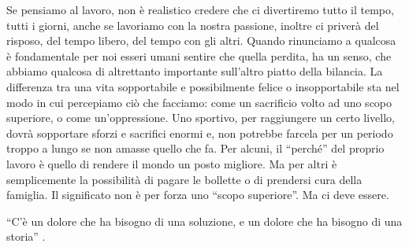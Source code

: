 \documentclass[12pt]{book} %
\begin{document}
\bigskip

Se pensiamo al lavoro, non è realistico credere che ci
divertiremo tutto il tempo, tutti i giorni, anche se lavoriamo con la nostra passione, inoltre ci priverà del risposo, 
del tempo libero, del tempo con gli altri.
Quando rinunciamo a qualcosa è fondamentale per noi esseri umani sentire che quella perdita, ha un senso, che abbiamo
qualcosa di altrettanto importante sull'altro piatto della bilancia. La differenza tra una vita
sopportabile e possibilmente felice o insopportabile sta nel modo in cui percepiamo ciò che facciamo: come un
sacrificio volto ad uno scopo superiore, o come un'oppressione. Uno sportivo, per raggiungere un
certo livello, dovrà sopportare sforzi e sacrifici enormi e, non potrebbe farcela per un periodo troppo a lungo se non
amasse quello che fa. Per alcuni, il “perché” del proprio lavoro è quello di rendere il mondo un posto migliore. Ma per
altri è semplicemente la possibilità di pagare le bollette o di prendersi cura della famiglia. Il significato non è per
forza uno “scopo superiore”. Ma ci deve essere. 

\bigskip

“C'è un dolore che ha bisogno di una soluzione, e un dolore che ha bisogno di una storia” .
\end{document}

